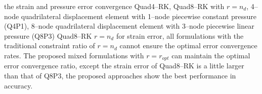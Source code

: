 \DIFaddend the strain and pressure error convergence  \DIFaddbegin {}\DIFaddend Quad4--RK, Quad8--RK with $r=n_d$,  4--node quadrilateral displacement element with 1--node piecewise constant pressure (Q4P1), 8--node quadrilateral displacement element with 3--node piecewise linear pressure (Q8P3)  \DIFaddbegin {}\DIFaddend Quad8--RK  \DIFaddbegin {}\DIFaddend $r=n_d$  for strain error, all formulations with the traditional constraint ratio of $r=n_d$ cannot ensure the optimal error convergence rates. The proposed mixed formulations with $r=r_{opt}$  can maintain the optimal error convergence ratio, except the strain error of Quad8--RK is a little larger than that of Q8P3, the proposed approaches show the best performance in accuracy.

